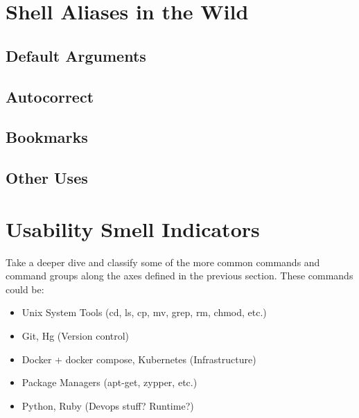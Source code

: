 \section{Shell Aliases in the Wild}



\subsection{Default Arguments}

\subsection{Autocorrect}





\subsection{Bookmarks}

\subsection{Other Uses}


\section{Usability Smell Indicators}

Take a deeper dive and classify some of the more common commands and command groups along the axes defined in the previous section. These commands could be:
\begin{itemize}
	\item Unix System Tools (cd, ls, cp, mv, grep, rm, chmod, etc.)
	\item Git, Hg (Version control)
	\item Docker + docker compose, Kubernetes (Infrastructure)
	\item Package Managers (apt-get, zypper, etc.)
	\item Python, Ruby (Devops stuff? Runtime?)
\end{itemize}

